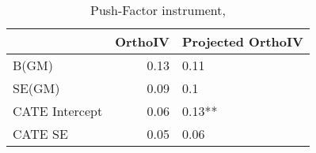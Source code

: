 \begin{table}\centering\caption{Push-Factor instrument, }\begin{tabular}{lrl}
\toprule
                &   OrthoIV & Projected OrthoIV   \\
\midrule
 B(GM)          &      0.13 & 0.11                \\
 SE(GM)         &      0.09 & 0.1                 \\
 CATE Intercept &      0.06 & 0.13**              \\
 CATE SE        &      0.05 & 0.06                \\
\bottomrule
\end{tabular}\end{table}